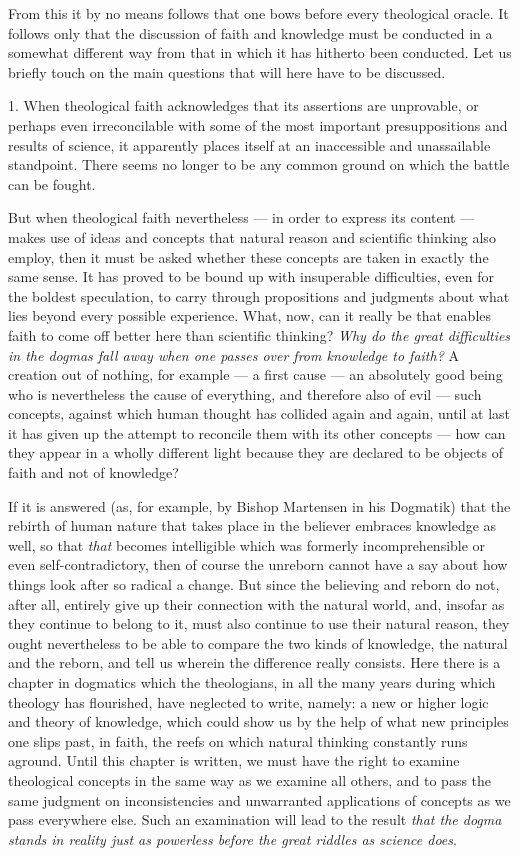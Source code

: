\documentclass[12pt,a4paper,openany]{book}
\newcommand{\opage}[1]{\marginnote{\footnotesize\textit{[#1]}}}
\begin{document}
From this it by no means follows that one bows before every theological oracle.
It follows only that the discussion of faith and knowledge must be conducted in
a somewhat different way from that in which it has hitherto been conducted. Let
us briefly touch on the main questions that will here have to be discussed.

1. When theological faith acknowledges that its assertions are
unprovable, or perhaps even irreconcilable with some of the most important
presuppositions and results of science, it apparently places itself at an
inaccessible and unassailable standpoint. There seems no longer to be any
common ground on which the battle can be fought.

But when theological faith nevertheless --- in order to express its content ---
makes use of ideas and concepts that natural reason and scientific
thinking also employ, then it must be asked whether these concepts are taken in
exactly the same sense. It has proved to be bound up with insuperable
difficulties, even for the boldest speculation, to carry through propositions
and judgments about what lies beyond every possible experience. What, now, can
it really be that enables faith to come off better here than scientific
thinking? \emph{Why do the great difficulties in the dogmas fall away when one passes
over from knowledge to faith?} A creation out of nothing, for example --- a
first cause --- an absolutely good being who is nevertheless the cause of
everything, and therefore also of evil --- such concepts, against which human
thought has collided again and again, until at last it has given up the attempt
to reconcile them with its other concepts --- how can they appear in a wholly
different light because they are declared to be objects of faith and not of
knowledge?

If it is answered (as, for example, by Bishop Martensen in his
Dogmatik) that the rebirth of human nature that takes place in the
believer embraces knowledge as well, so that
\opage{212}\emph{that} becomes intelligible which was formerly incomprehensible
or even self-contradictory, then of course the unreborn
cannot have a say about how things look after so radical a change. But since
the believing and reborn do not, after all, entirely give up their connection
with the natural world, and, insofar as they continue to belong to it, must
also continue to use their natural reason, they ought nevertheless to be able to
compare the two kinds of knowledge, the natural and the reborn, and tell us
wherein the difference really consists. Here there is a chapter in dogmatics
which the theologians, in all the many years during which theology has
flourished, have neglected to write, namely: a new or higher logic and theory of
knowledge, which could show us by the help of what new principles one slips
past, in faith, the reefs on which natural thinking constantly runs aground.
Until this chapter is written, we must have the right to examine theological
concepts in the same way as we examine all others, and to pass the same judgment
on inconsistencies and unwarranted applications of concepts as we pass
everywhere else. Such an examination will lead to the result \emph{that the dogma
stands in reality just as powerless before the great riddles as science does}.
\end{document}
